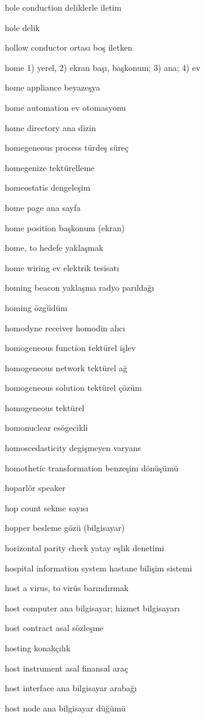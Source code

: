 \documentclass[12pt,fleqn]{article}\usepackage{../../common}
\begin{document}
hole conduction deliklerle iletim

hole delik

hollow conductor ortası boş iletken

home 1) yerel, 2) ekran başı, başkonum; 3) ana; 4) ev

home appliance beyazeşya

home automation ev otomasyonu

home directory ana dizin

homegeneous process türdeş süreç

homegenize tektürelleme

homeostatis dengeleşim

home page ana sayfa

home position başkonum (ekran)

home, to hedefe yaklaşmak

home wiring ev elektrik tesisatı

homing beacon yaklaşma radyo parıldağı

homing özgüdüm

homodyne receiver homodin alıcı

homogeneous function tektürel işlev

homogeneous network tektürel ağ

homogeneous solution tektürel çözüm

homogeneous tektürel

homonuclear esögecikli

homoscedasticity degişmeyen varyans

homothetic transformation benzeşim dönüşümü

hoparlör speaker

hop count sekme sayısı

hopper besleme gözü (bilgisayar)

horizontal parity check yatay eşlik denetimi

hospital information system hastane bilişim sistemi

host a virus, to virüs barındırmak

host computer ana bilgisayar; hizmet bilgisayarı

host contract asal sözleşme

hosting konakçılık

host instrument asal finansal araç

host interface ana bilgisayar arabağı

host node ana bilgisayar düğümü
\end{document}
